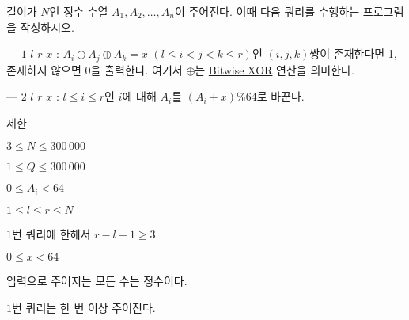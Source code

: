 길이가 $N$인 정수 수열 $A_1,A_2,\dots,A_n$이 주어진다. 이때 다음 쿼리를 수행하는 프로그램을 작성하시오.

--- $1$ $l$ $r$ $x$ : $A_i \oplus A_j \oplus A_k = x$ $(l \le i < j < k \le r)$인 $(i,j,k)$쌍이 존재한다면 1, 존재하지 않으면 0을 출력한다. 여기서  $\oplus$는 \href{https://en.wikipedia.org/wiki/Bitwise_operation#XOR}{Bitwise XOR} 연산을 의미한다.

--- $2$ $l$ $r$ $x$ : $l \le i \le r$인 $i$에 대해 $A_i$를 $(A_i+x)\%64$로 바꾼다.

제한

$3 \le N \le 300\,000$

$1 \le Q \le 300\,000$

$0 \le A_i < 64$

$1 \le l \le r \le N$

$1$번 쿼리에 한해서 $r-l+1 \ge 3$

$0 \le x < 64$

입력으로 주어지는 모든 수는 정수이다.

$1$번 쿼리는 한 번 이상 주어진다.
